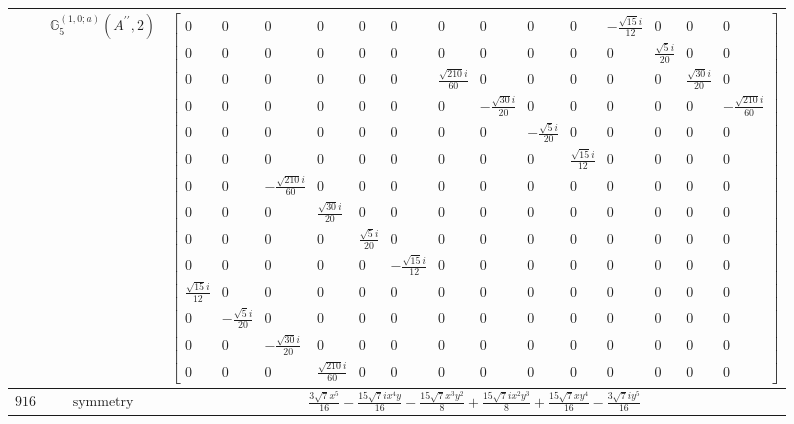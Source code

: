 \documentclass[fleqn,8pt,landscape]{jsarticle}
\begin{document}
\begin{longtable}{ccc}
$  $ & $ \mathbb{G}_{5}^{(1,0;a)}(A^{\prime\prime},2) $ & $ \begin{bmatrix} 0 & 0 & 0 & 0 & 0 & 0 & 0 & 0 & 0 & 0 & - \frac{\sqrt{15} i}{12} & 0 & 0 & 0 \\ 0 & 0 & 0 & 0 & 0 & 0 & 0 & 0 & 0 & 0 & 0 & \frac{\sqrt{5} i}{20} & 0 & 0 \\ 0 & 0 & 0 & 0 & 0 & 0 & \frac{\sqrt{210} i}{60} & 0 & 0 & 0 & 0 & 0 & \frac{\sqrt{30} i}{20} & 0 \\ 0 & 0 & 0 & 0 & 0 & 0 & 0 & - \frac{\sqrt{30} i}{20} & 0 & 0 & 0 & 0 & 0 & - \frac{\sqrt{210} i}{60} \\ 0 & 0 & 0 & 0 & 0 & 0 & 0 & 0 & - \frac{\sqrt{5} i}{20} & 0 & 0 & 0 & 0 & 0 \\ 0 & 0 & 0 & 0 & 0 & 0 & 0 & 0 & 0 & \frac{\sqrt{15} i}{12} & 0 & 0 & 0 & 0 \\ 0 & 0 & - \frac{\sqrt{210} i}{60} & 0 & 0 & 0 & 0 & 0 & 0 & 0 & 0 & 0 & 0 & 0 \\ 0 & 0 & 0 & \frac{\sqrt{30} i}{20} & 0 & 0 & 0 & 0 & 0 & 0 & 0 & 0 & 0 & 0 \\ 0 & 0 & 0 & 0 & \frac{\sqrt{5} i}{20} & 0 & 0 & 0 & 0 & 0 & 0 & 0 & 0 & 0 \\ 0 & 0 & 0 & 0 & 0 & - \frac{\sqrt{15} i}{12} & 0 & 0 & 0 & 0 & 0 & 0 & 0 & 0 \\ \frac{\sqrt{15} i}{12} & 0 & 0 & 0 & 0 & 0 & 0 & 0 & 0 & 0 & 0 & 0 & 0 & 0 \\ 0 & - \frac{\sqrt{5} i}{20} & 0 & 0 & 0 & 0 & 0 & 0 & 0 & 0 & 0 & 0 & 0 & 0 \\ 0 & 0 & - \frac{\sqrt{30} i}{20} & 0 & 0 & 0 & 0 & 0 & 0 & 0 & 0 & 0 & 0 & 0 \\ 0 & 0 & 0 & \frac{\sqrt{210} i}{60} & 0 & 0 & 0 & 0 & 0 & 0 & 0 & 0 & 0 & 0 \end{bmatrix} $ \\ \hline
$ 916 $ & $ \text{symmetry} $ & $ \frac{3 \sqrt{7} x^{5}}{16} - \frac{15 \sqrt{7} i x^{4} y}{16} - \frac{15 \sqrt{7} x^{3} y^{2}}{8} + \frac{15 \sqrt{7} i x^{2} y^{3}}{8} + \frac{15 \sqrt{7} x y^{4}}{16} - \frac{3 \sqrt{7} i y^{5}}{16} $ \\

\end{longtable}
\end{document}
